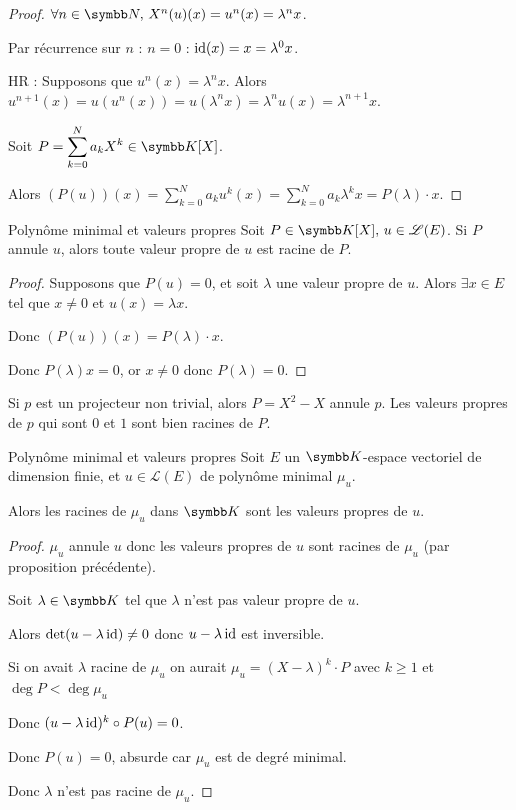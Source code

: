 \begin{proof}
    $\forall n \in \N, \, X^n(u)(x) = u^n(x) = \lambda^n x$.

    Par récurrence sur $n$ : $n = 0$ : $\operatorname{id}(x) = x = \lambda^0 x$.

    HR : Supposons que $u^n(x) = \lambda^n x$. Alors $u^{n + 1}(x) = u(u^n(x)) = u(\lambda^n x) = \lambda^n u(x) = \lambda^{n + 1} x$.

    Soit $P = \displaystyle \sum_{k = 0 }^{ N } a_k X^k \in \K[X]$.

    Alors $(P(u))(x) = \sum_{k = 0 }^{ N } a_k u^k(x) = \sum_{k = 0 }^{ N } a_k \lambda^k x = P(\lambda) \cdot x$.
\end{proof}

\begin{proposition}{Polynôme minimal et valeurs propres}{}
    Soit $P \in \K[X], \, u \in \mathscr L(E)$. Si $P$ annule $u$, alors toute valeur propre de 
    $u$ est racine de $P$.
\end{proposition}

\begin{proof}
    Supposons que $P(u) = 0$, et soit $\lambda $ une valeur propre de $u$. Alors 
    $\exists x \in E$ tel que $x \neq 0$ et $u(x) = \lambda x$.

    Donc $(P(u))(x) = P(\lambda) \cdot x$.

    Donc $P(\lambda)x = 0$, or $x \neq 0$ donc $P(\lambda) = 0$.
\end{proof}

\begin{exemple}
    Si $p$ est un projecteur non trivial, alors $P = X^2 -X$ annule $p$. Les valeurs propres de 
    $p$ qui sont $0$ et $1$ sont bien racines de $P$.
\end{exemple}

\begin{proposition}{Polynôme minimal et valeurs propres}{}
    Soit $E$ un $\K$-espace vectoriel de dimension finie, et $u \in \mathscr L(E)$ de polynôme minimal $\mu_u$.

    Alors les racines de $\mu_u$ dans $\K$ sont les valeurs propres de $u$.
\end{proposition}

\begin{proof}
    $\mu_u$ annule $u$ donc les valeurs propres de $u$ sont racines de $\mu_u$ (par proposition précédente).

    Soit $\lambda \in \K$ tel que $\lambda$ n'est pas valeur propre de $u$. 

    Alors $\det(u - \lambda \operatorname{id}) \neq 0$ donc $u - \lambda \operatorname{id}$ est inversible.

    Si on avait $\lambda $ racine de $\mu_u$ on aurait $\mu_u = (X - \lambda)^k \cdot P$ avec $k \geqslant 1$ et 
    $\deg P < \deg \mu_u$

    Donc $(u - \lambda \operatorname{id})^k \circ P(u) = 0$. 

    Donc $P(u) = 0$, absurde car $\mu_u$ est de degré minimal.

    Donc $\lambda$ n'est pas racine de $\mu_u$.
\end{proof}


